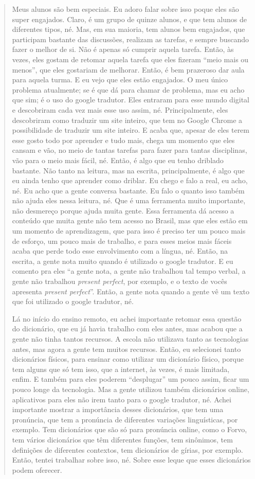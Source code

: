 \documentclass{textolivre}
\begin{document}
\begin{quote}
Meus alunos são bem especiais. Eu adoro falar sobre isso poque eles são super engajados. Claro, é um grupo de quinze alunos, e que tem alunos de diferentes tipos, né. Mas, em sua maioria, tem alunos bem engajados, que participam bastante das discussões, realizam as tarefas, e sempre buscando fazer o melhor de si. Não é apenas só cumprir aquela tarefa. Então, às vezes, eles gostam de retomar aquela tarefa que eles fizeram “meio mais ou menos”, que eles gostariam de melhorar. Então, é bem prazeroso dar aula para aquela turma. E eu vejo que eles estão engajados. O meu único problema atualmente; se é que dá para chamar de problema, mas eu acho que sim; é o uso do google tradutor. Eles entraram para esse mundo digital e descobriram cada vez mais esse uso assim, né. Principalmente, eles descobriram como traduzir um site inteiro, que tem no Google Chrome a possibilidade de traduzir um site inteiro. E acaba que, apesar de eles terem esse gosto todo por aprender e tudo mais, chega um momento que eles cansam e vão, no meio de tantas tarefas para fazer para tantas disciplinas, vão para o meio mais fácil, né. Então, é algo que eu tenho driblado bastante. Não tanto na leitura, mas na escrita, principalmente, é algo que eu ainda tenho que aprender como driblar. Eu chego e falo a real, eu acho, né. Eu acho que a gente conversa bastante. Eu falo o quanto isso também não ajuda eles nessa leitura, né. Que é uma ferramenta muito importante, não desmereço porque ajuda muita gente. Essa ferramenta dá acesso a conteúdo que muita gente não tem acesso no Brasil, mas que eles estão em um momento de aprendizagem, que para isso é preciso ter um pouco mais de esforço, um pouco mais de trabalho, e para esses meios mais fáceis acaba que perde todo esse envolvimento com a língua, né. Então, na escrita, a gente nota muito quando é utilizado o google tradutor. E eu comento pra eles “a gente nota, a gente não trabalhou tal tempo verbal, a gente não trabalhou \emph{present perfect}, por exemplo, e o texto de vocês apresenta \emph{present perfect}”. Então, a gente nota quando a gente vê um texto que foi utilizado o google tradutor, né.

Lá no início do ensino remoto, eu achei importante retomar essa questão do dicionário, que eu já havia trabalho com eles antes, mas acabou que a gente não tinha tantos recursos. A escola não utilizava tanto as tecnologias antes, mas agora a gente tem muitos recursos. Então, eu selecionei tanto dicionários físicos, para ensinar como utilizar um dicionário físico, porque tem alguns que só tem isso, que a internet, às vezes, é mais limitada, enfim. E também para eles poderem “desplugar” um pouco assim, ficar um pouco longe da tecnologia. Mas a gente utilizou também dicionários online, aplicativos para eles não irem tanto para o google tradutor, né. Achei importante mostrar a importância desses dicionários, que tem uma pronúncia, que tem a pronúncia de diferentes variações linguísticas, por exemplo. Tem dicionários que são só para pronúncia online, como o Forvo, tem vários dicionários que têm diferentes funções, tem sinônimos, tem definições de diferentes contextos, tem dicionários de gírias, por exemplo. Então, tentei trabalhar sobre isso, né. Sobre esse leque que esses dicionários podem oferecer.
\end{quote}
\end{document}
